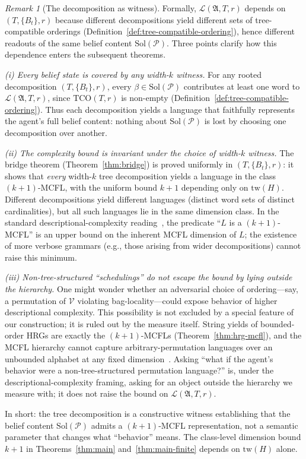 \documentclass[11pt,a4paper]{article}
\theoremstyle{plain}
\theoremstyle{definition}
\theoremstyle{remark}
\newtheorem{remark}[theorem]{Remark}
\begin{document}
\begin{remark}[The decomposition as witness]\label{rem:td-dependence}
Formally, $\mathcal{L}(\mathfrak{A}, T, r)$ depends on $(T, \{B_t\}, r)$ because different decompositions yield different sets of tree-compatible orderings (Definition~\ref{def:tree-compatible-ordering}), hence different readouts of the same belief content $\mathrm{Sol}(\mathcal{P})$.
Three points clarify how this dependence enters the subsequent theorems.

\emph{(i) Every belief state is covered by any width-$k$ witness.} For any rooted decomposition $(T, \{B_t\}, r)$, every $\beta \in \mathrm{Sol}(\mathcal{P})$ contributes at least one word to $\mathcal{L}(\mathfrak{A}, T, r)$, since $\mathrm{TCO}(T, r)$ is non-empty (Definition~\ref{def:tree-compatible-ordering}). Thus each decomposition yields a language that faithfully represents the agent's full belief content: nothing about $\mathrm{Sol}(\mathcal{P})$ is lost by choosing one decomposition over another.

\emph{(ii) The complexity bound is invariant under the choice of width-$k$ witness.} The bridge theorem (Theorem~\ref{thm:bridge}) is proved uniformly in $(T, \{B_t\}, r)$: it shows that \emph{every} width-$k$ tree decomposition yields a language in the class $(k{+}1)$-MCFL, with the uniform bound $k+1$ depending only on $\mathrm{tw}(H)$. Different decompositions yield different languages (distinct word sets of distinct cardinalities), but all such languages lie in the same dimension class. In the standard descriptional-complexity reading~\cite{HolzerKutrib11}, the predicate ``$L$ is a $(k{+}1)$-MCFL'' is an upper bound on the inherent MCFL dimension of $L$; the existence of more verbose grammars (e.g., those arising from wider decompositions) cannot raise this minimum.

\emph{(iii) Non-tree-structured ``schedulings'' do not escape the bound by lying outside the hierarchy.} One might wonder whether an adversarial choice of ordering---say, a permutation of $\mathcal{V}$ violating bag-locality---could expose behavior of higher descriptional complexity. This possibility is not excluded by a special feature of our construction; it is ruled out by the measure itself. String yields of bounded-order HRGs are exactly the $(k{+}1)$-MCFLs (Theorem~\ref{thm:hrg-mcfl}), and the MCFL hierarchy cannot capture arbitrary-permutation languages over an unbounded alphabet at any fixed dimension~\cite{Seki91}. Asking ``what if the agent's behavior were a non-tree-structured permutation language?'' is, under the descriptional-complexity framing, asking for an object outside the hierarchy we measure with; it does not raise the bound on $\mathcal{L}(\mathfrak{A}, T, r)$.

In short: the tree decomposition is a constructive witness establishing that the belief content $\mathrm{Sol}(\mathcal{P})$ admits a $(k{+}1)$-MCFL representation, not a semantic parameter that changes what ``behavior'' means. The class-level dimension bound $k+1$ in Theorems~\ref{thm:main} and~\ref{thm:main-finite} depends on $\mathrm{tw}(H)$ alone.
\end{remark}
\end{document}
